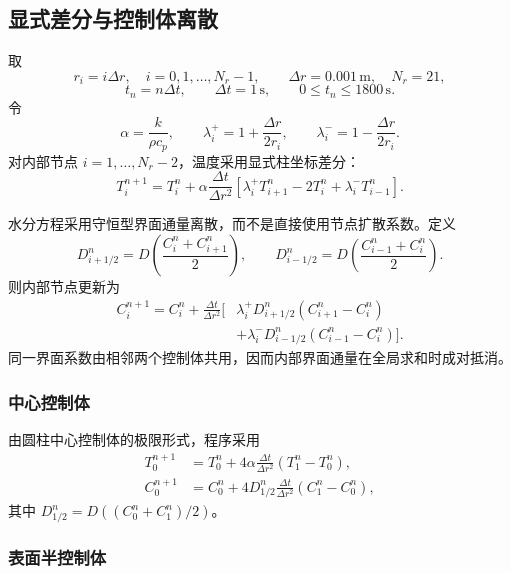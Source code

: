 \documentclass[UTF8,a4paper,11pt]{ctexart}
\numberwithin{equation}{section}
\begin{document}
\subsection{显式差分与控制体离散}

取
\[
r_i=i\Delta r,\quad i=0,1,\ldots,N_r-1,\qquad
\Delta r=0.001\,\mathrm{m},\quad N_r=21,
\]
\[
t_n=n\Delta t,\qquad \Delta t=1\,\mathrm{s},\qquad
0\le t_n\le1800\,\mathrm{s}.
\]
令
\[
\alpha=\frac{k}{\rho c_p},\qquad
\lambda_i^+=1+\frac{\Delta r}{2r_i},\qquad
\lambda_i^-=1-\frac{\Delta r}{2r_i}.
\]
对内部节点 \(i=1,\ldots,N_r-2\)，温度采用显式柱坐标差分：
\begin{equation}
T_i^{n+1}=T_i^n+\alpha\frac{\Delta t}{\Delta r^2}
\left[\lambda_i^+T_{i+1}^n-2T_i^n+\lambda_i^-T_{i-1}^n\right].
\label{eq:q1-T-inner}
\end{equation}

水分方程采用守恒型界面通量离散，而不是直接使用节点扩散系数。定义
\begin{equation}
D_{i+1/2}^n
=D\left(\frac{C_i^n+C_{i+1}^n}{2}\right),\qquad
D_{i-1/2}^n
=D\left(\frac{C_{i-1}^n+C_i^n}{2}\right).
\label{eq:q1-D-face}
\end{equation}
则内部节点更新为
\begin{equation}
\begin{aligned}
C_i^{n+1}=C_i^n+\frac{\Delta t}{\Delta r^2}\big[&
\lambda_i^+D_{i+1/2}^n(C_{i+1}^n-C_i^n)\\
&+\lambda_i^-D_{i-1/2}^n(C_{i-1}^n-C_i^n)\big].
\end{aligned}
\label{eq:q1-C-inner}
\end{equation}
同一界面系数由相邻两个控制体共用，因而内部界面通量在全局求和时成对抵消。

\subsubsection{中心控制体}

由圆柱中心控制体的极限形式，程序采用
\begin{align}
T_0^{n+1}
&=T_0^n+4\alpha\frac{\Delta t}{\Delta r^2}(T_1^n-T_0^n), \label{eq:q1-T-center}\\
C_0^{n+1}
&=C_0^n+4D_{1/2}^n\frac{\Delta t}{\Delta r^2}(C_1^n-C_0^n), \label{eq:q1-C-center}
\end{align}
其中 \(D_{1/2}^n=D((C_0^n+C_1^n)/2)\)。

\subsubsection{表面半控制体}
\end{document}
